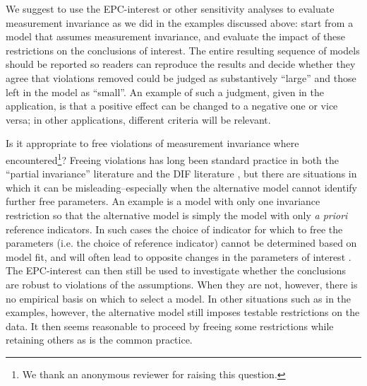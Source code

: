 \documentclass[letterpaper,12pt]{article}
\begin{document}
We suggest to use the EPC-interest or other sensitivity analyses to evaluate measurement invariance as we did in the examples discussed above: start from a model that assumes measurement invariance, and evaluate the impact of these restrictions on the conclusions of interest. The entire resulting sequence of models should be reported so readers can reproduce the results and decide whether they agree that violations removed could be judged as substantively ``large'' and those left in the model as ``small''. An example of such a judgment, given in the application, is that a positive effect can be changed to a negative one or vice versa; in other applications, different criteria will be relevant.

Is it appropriate to free violations of measurement invariance where encountered\footnote{We thank an anonymous reviewer for raising this question.}? Freeing violations has long been standard practice in both the ``partial invariance'' literature \citep{byrne1989testing} and the DIF literature \citep{Holland:1993aa}, but there are situations in which it can be misleading--especially when the alternative model cannot identify further free parameters. An example is a model with only one invariance restriction so that the alternative model is simply the model with only \emph{a priori} reference indicators. In such cases the choice of indicator for which to free the parameters (i.e. the choice of reference indicator) cannot be determined based on model fit, and will often lead to opposite changes in the parameters of interest \citep{hancock2009tenuousness}. The EPC-interest can then still be used to investigate whether the conclusions are robust to violations of the assumptions. When they are not, however, there is no empirical basis on which to select a model. In other situations such as in the examples, however, the alternative model still imposes testable restrictions on the data. It then seems reasonable to proceed by freeing some restrictions while retaining others as is the common practice.



\end{document}
